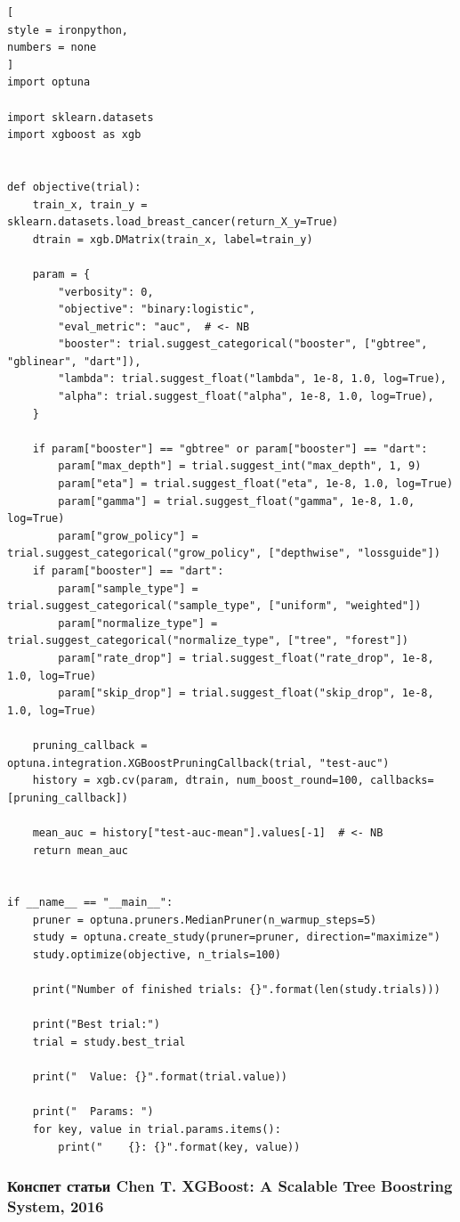 \documentclass[%
	11pt,
	a4paper,
	utf8,
		]{article}
\begin{document}
\begin{lstlisting}[
style = ironpython,
numbers = none
]
import optuna

import sklearn.datasets
import xgboost as xgb


def objective(trial):
	train_x, train_y = sklearn.datasets.load_breast_cancer(return_X_y=True)
	dtrain = xgb.DMatrix(train_x, label=train_y)

	param = {
		"verbosity": 0,
		"objective": "binary:logistic",
		"eval_metric": "auc",  # <- NB
		"booster": trial.suggest_categorical("booster", ["gbtree", "gblinear", "dart"]),
		"lambda": trial.suggest_float("lambda", 1e-8, 1.0, log=True),
		"alpha": trial.suggest_float("alpha", 1e-8, 1.0, log=True),
	}

	if param["booster"] == "gbtree" or param["booster"] == "dart":
		param["max_depth"] = trial.suggest_int("max_depth", 1, 9)
		param["eta"] = trial.suggest_float("eta", 1e-8, 1.0, log=True)
		param["gamma"] = trial.suggest_float("gamma", 1e-8, 1.0, log=True)
		param["grow_policy"] = trial.suggest_categorical("grow_policy", ["depthwise", "lossguide"])
	if param["booster"] == "dart":
		param["sample_type"] = trial.suggest_categorical("sample_type", ["uniform", "weighted"])
		param["normalize_type"] = trial.suggest_categorical("normalize_type", ["tree", "forest"])
		param["rate_drop"] = trial.suggest_float("rate_drop", 1e-8, 1.0, log=True)
		param["skip_drop"] = trial.suggest_float("skip_drop", 1e-8, 1.0, log=True)

	pruning_callback = optuna.integration.XGBoostPruningCallback(trial, "test-auc")
	history = xgb.cv(param, dtrain, num_boost_round=100, callbacks=[pruning_callback])
	
	mean_auc = history["test-auc-mean"].values[-1]  # <- NB
	return mean_auc


if __name__ == "__main__":
	pruner = optuna.pruners.MedianPruner(n_warmup_steps=5)
	study = optuna.create_study(pruner=pruner, direction="maximize")
	study.optimize(objective, n_trials=100)
	
	print("Number of finished trials: {}".format(len(study.trials)))
	
	print("Best trial:")
	trial = study.best_trial
	
	print("  Value: {}".format(trial.value))
	
	print("  Params: ")
	for key, value in trial.params.items():
		print("    {}: {}".format(key, value))	
\end{lstlisting}

\subsubsection{Конспет статьи Chen T. XGBoost: A Scalable Tree Boostring System, 2016}
\end{document}
